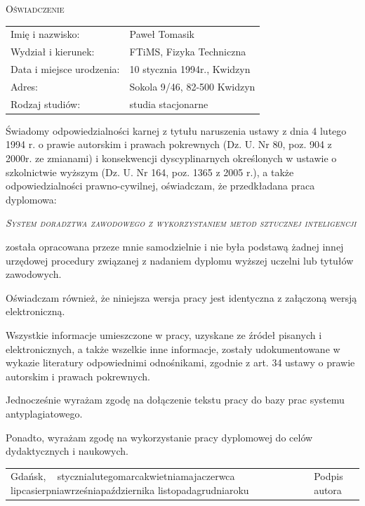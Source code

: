 \documentclass[12pt,a4paper,oneside]{report} %
\def\PLdateending{\space roku}
\def\today{\number\day~\ifcase\month\or
           stycznia\or lutego\or marca\or kwietnia\or maja\or czerwca\or
           lipca\or sierpnia\or wrze\'snia\or pa\'zdziernika\or
           listopada\or grudnia\fi \space\number\year \PLdateending}
\begin{document}
{\centering\scshape Oświadczenie\par}
\vspace{1cm}
{
\raggedright
\begin{tabular}{ll}
Imię i nazwisko: & Paweł Tomasik \\
Wydział i kierunek: & FTiMS, Fizyka Techniczna \\
Data i miejsce urodzenia: & 10 stycznia 1994r., Kwidzyn \\
Adres: & Sokola 9/46, 82-500 Kwidzyn \\
Rodzaj studiów: & studia stacjonarne \\
\end{tabular}\hfill\par
}
\vspace{1cm}
Świadomy odpowiedzialności karnej z tytułu naruszenia ustawy z dnia 4 lutego 1994 r. o prawie autorskim i prawach pokrewnych
(Dz. U. Nr 80, poz. 904 z 2000r. ze zmianami) i konsekwencji dyscyplinarnych określonych w ustawie o szkolnictwie wyższym (Dz. U. Nr 164, poz. 1365 z 2005 r.), a także odpowiedzialności prawno-cywilnej, oświadczam, że przedkładana praca dyplomowa:\par 
\vspace{0.5cm}
{
    \scshape\noindent\itshape System doradztwa zawodowego z wykorzystaniem metod sztucznej inteligencji\par}
\vspace{0.5cm}
\noindent została opracowana przeze mnie samodzielnie i nie była podstawą żadnej innej urzędowej procedury związanej z nadaniem dyplomu wyższej uczelni lub tytułów zawodowych.\par
Oświadczam również, że niniejsza wersja pracy jest identyczna z załączoną wersją elektroniczną.\par
Wszystkie informacje umieszczone w pracy, uzyskane ze źródeł pisanych i elektronicznych, a także wszelkie inne informacje, zostały udokumentowane w wykazie literatury odpowiednimi odnośnikami, zgodnie z art. 34 ustawy o prawie autorskim i prawach pokrewnych. \par
Jednocześnie wyrażam zgodę na dołączenie tekstu pracy do bazy prac systemu antyplagiatowego. \par
Ponadto, wyrażam zgodę na wykorzystanie pracy dyplomowej do celów dydaktycznych i naukowych. \par
\vfill
{\centering
\begin{tabular}{lll}
Gdańsk, \today & \hspace{4cm} & Podpis autora \\
\end{tabular}
}
\vspace{1cm}
\pagebreak
\end{document}
